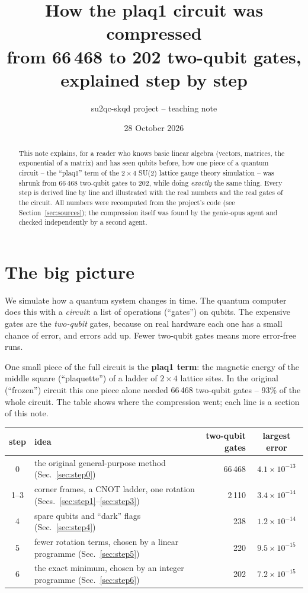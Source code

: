 \documentclass[11pt]{article}
\title{\textbf{How the plaq1 circuit was compressed}\\[4pt]
\large from 66\,468 to 202 two-qubit gates, explained step by step}
\author{su2qc-skqd project -- teaching note}
\date{28 October 2026}
\begin{document}
\maketitle

\begin{abstract}\noindent
This note explains, for a reader who knows basic linear algebra (vectors, matrices, the exponential of a
matrix) and has seen qubits before, how one piece of a quantum circuit -- the ``plaq1'' term of the
$2\times4$ SU(2) lattice gauge theory simulation -- was shrunk from 66\,468 two-qubit gates to 202, while
doing \emph{exactly} the same thing.  Every step is derived line by line and illustrated with the real
numbers and the real gates of the circuit.  All numbers were recomputed from the project's code (see
Section~\ref{sec:sources}); the compression itself was found by the genie-opus agent and checked
independently by a second agent.
\end{abstract}

\tableofcontents
\clearpage

\section{The big picture}

We simulate how a quantum system changes in time.  The quantum computer does this with a \emph{circuit}: a
list of operations (``gates'') on qubits.  The expensive gates are the \emph{two-qubit} gates, because on
real hardware each one has a small chance of error, and errors add up.  Fewer two-qubit gates means more
error-free runs.

One small piece of the full circuit is the \textbf{plaq1 term}: the magnetic energy of the middle square
(``plaquette'') of a ladder of $2\times4$ lattice sites.  In the original (``frozen'') circuit this one
piece alone needed 66\,468 two-qubit gates -- 93\% of the whole circuit.  The table shows where the
compression went; each line is a section of this note.

\begin{center}\small
\begin{tabular}{c l r c}
\toprule
step & idea & two-qubit gates & largest error\\
\midrule
0 & the original general-purpose method (Sec.~\ref{sec:step0}) & 66\,468 & $4.1\times10^{-13}$\\
1--3 & corner frames, a CNOT ladder, one rotation (Secs.~\ref{sec:step1}--\ref{sec:step3}) & 2\,110 & $3.4\times10^{-14}$\\
4 & spare qubits and ``dark'' flags (Sec.~\ref{sec:step4}) & 238 & $1.2\times10^{-14}$\\
5 & fewer rotation terms, chosen by a linear programme (Sec.~\ref{sec:step5}) & 220 & $9.5\times10^{-15}$\\
6 & the exact minimum, chosen by an integer programme (Sec.~\ref{sec:step6}) & 202 & $7.2\times10^{-15}$\\
\bottomrule
\end{tabular}
\end{center}
\end{document}

